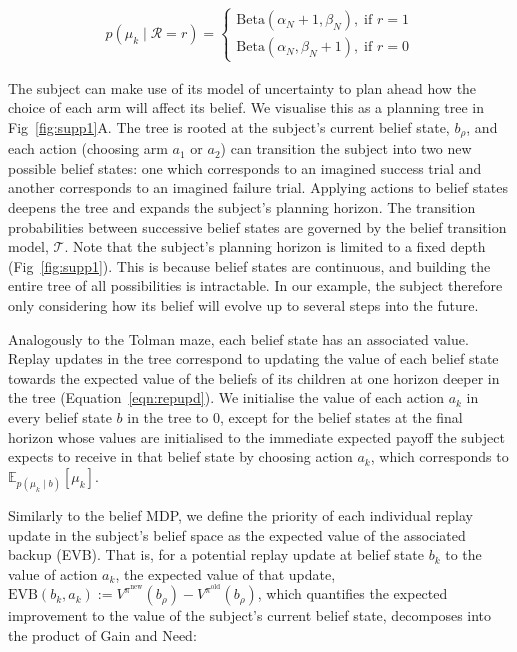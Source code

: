 \begin{align}
    p(\mu_k \mid \mathcal{R}=r) = 
    \begin{cases}
    \text{Beta}(\alpha_N + 1, \beta_N), \; \text{if $r=1$}\\
    \text{Beta}(\alpha_N, \beta_N+1), \; \text{if $r=0$}
    \end{cases}
\end{align}

The subject can make use of its model of uncertainty to plan ahead how the choice of each arm will affect its belief. We visualise this as a planning tree in Fig~\ref{fig:supp1}A. The tree is rooted at the subject's current belief state, $b_\rho$, and each action (choosing arm $a_1$ or $a_2$) can transition the subject into two new possible belief states: one which corresponds to an imagined success trial and another corresponds to an imagined failure trial. Applying actions to belief states deepens the tree and expands the subject's planning horizon. The transition probabilities between successive belief states are governed by the belief transition model, $\mathcal{T}$. Note that the subject's planning horizon is limited to a fixed depth (Fig~\ref{fig:supp1}). This is because belief states are continuous, and building the entire tree of all possibilities is intractable. In our example, the subject therefore only considering how its belief will evolve up to several steps into the future.

Analogously to the Tolman maze, each belief state  has an associated value. Replay updates in the tree correspond to updating the value of each belief state towards the expected value of the beliefs of its children at one horizon deeper in the tree (Equation~\ref{eqn:repupd}). We initialise the value of each action $a_k$ in every belief state $b$ in the tree to $0$, except for the belief states at the final horizon whose values are initialised to the immediate expected payoff the subject expects to receive in that belief state by choosing action $a_k$, which corresponds to $\mathbb{E}_{p(\mu_k \mid b)}\left[ \mu_k \right]$.

Similarly to the belief MDP, we define the priority of each individual replay update in the subject's belief space as the expected value of the associated backup (EVB). That is, for a potential replay update at belief state $b_k$ to the value of action $a_k$, the expected value of that update, $\text{EVB}(b_k, a_k) := V^{\pi^{\text{new}}}(b_\rho) - V^{\pi^{\text{old}}}(b_\rho)$, which quantifies the expected improvement to the value of the subject's current belief state, decomposes into the product of Gain and Need:

